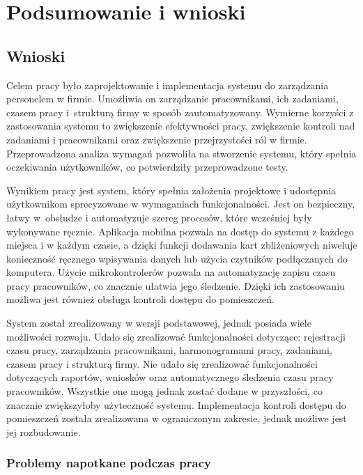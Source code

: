 \chapter{Podsumowanie i wnioski}

\section{Wnioski}

Celem pracy było zaprojektowanie i implementacja systemu do zarządzania personelem w firmie. Umożliwia on zarządzanie pracownikami, ich zadaniami, czasem pracy i~strukturą firmy w sposób zautomatyzowany. Wymierne korzyści z zastosowania systemu to zwiększenie efektywności pracy, zwiększenie kontroli nad zadaniami i pracownikami oraz zwiększenie przejrzystości ról w firmie. Przeprowadzona analiza wymagań pozwoliła na stworzenie systemu, który spełnia oczekiwania użytkowników, co potwierdziły przeprowadzone testy.

Wynikiem pracy jest system, który spełnia założenia projektowe i udostępnia użytkownikom sprecyzowane w wymaganiach funkcjonalności. Jest on bezpieczny, łatwy w~obsłudze i automatyzuje szereg procesów, które wcześniej były wykonywane ręcznie. Aplikacja mobilna pozwala na dostęp do systemu z każdego miejsca i w każdym czasie, a dzięki funkcji dodawania kart zbliżeniowych niweluje konieczność ręcznego wpisywania danych lub użycia czytników podłączanych do komputera. Użycie mikrokontrolerów pozwala na automatyzację zapisu czasu pracy pracowników, co znacznie ułatwia jego śledzenie. Dzięki ich zastosowaniu możliwa jest również obsługa kontroli dostępu do pomieszczeń.

System został zrealizowany w wersji podstawowej, jednak posiada wiele możliwości rozwoju. Udało się zrealizować funkcjonalności dotyczące: rejestracji czasu pracy, zarządzania pracownikami, harmonogramami pracy, zadaniami, czasem pracy i strukturą firmy. Nie udało się zrealizować funkcjonalności dotyczących raportów, wniosków oraz automatycznego śledzenia czasu pracy pracowników. Wszystkie one mogą jednak zostać dodane w przyszłości, co znacznie zwiększyłoby użyteczność systemu. Implementacja kontroli dostępu do pomieszczeń została zrealizowana w ograniczonym zakresie, jednak możliwe jest jej rozbudowanie.

\subsection{Problemy napotkane podczas pracy}

